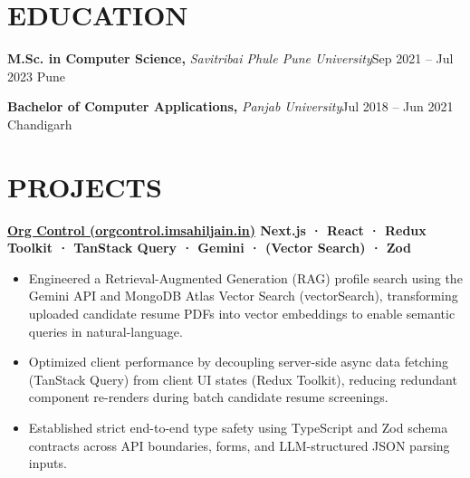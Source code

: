 \documentclass[10pt, letterpaper]{article}
\newcommand{\projentry}[1]{%
  \vspace{2pt}\noindent\textbf{#1}\par\vspace{3pt}
}
\newcommand{\eduentry}[3]{%
  \noindent\textbf{#1,} \textit{#2}\hfill #3\par\vspace{3pt}
}
\begin{document}


\section*{EDUCATION}

\eduentry{M.Sc. in Computer Science}{Savitribai Phule Pune University}{Sep 2021 – Jul 2023 \textbar{} Pune}
\eduentry{Bachelor of Computer Applications}{Panjab University}{Jul 2018 – Jun 2021 \textbar{} Chandigarh}

\section*{PROJECTS}

\projentry{\href{https://orgcontrol.imsahiljain.in}{Org Control (orgcontrol.imsahiljain.in)} \textbar{} Next.js · React · Redux Toolkit · TanStack Query · Gemini · (Vector Search) · Zod}
\begin{itemize}
  \item Engineered a Retrieval-Augmented Generation (RAG) profile search using the Gemini API and MongoDB Atlas Vector Search (vectorSearch), transforming uploaded candidate resume PDFs into vector embeddings to enable semantic queries in natural-language.
  \item Optimized client performance by decoupling server-side async data fetching (TanStack Query) from client UI states (Redux Toolkit), reducing redundant component re-renders during batch candidate resume screenings.
  \item Established strict end-to-end type safety using TypeScript and Zod schema contracts across API boundaries, forms, and LLM-structured JSON parsing inputs.
\end{itemize}
\end{document}
